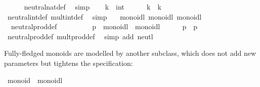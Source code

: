 \begin{isabellebody}
\ \ \ \ \isamarkupfalse%
\ neutral{\isacharunderscore}nat{\isacharunderscore}def\ \isamarkupfalse%
\ simp\isanewline
{}\isamarkupfalse%
\isanewline
\ \ \isamarkupfalse%
\ k\ {\isacharcolon}{\isacharcolon}\ int\isanewline
\ \ \isamarkupfalse%
\ {\isachardoublequoteopen}{\isasymone}\ {\isasymotimes}\ k\ {\isacharequal}\ k{\isachardoublequoteclose}\isanewline
\ \ \ \ \isamarkupfalse%
\ neutral{\isacharunderscore}int{\isacharunderscore}def\ mult{\isacharunderscore}int{\isacharunderscore}def\ \isamarkupfalse%
\ simp\isanewline
{}\isamarkupfalse%
\isanewline
\isanewline
{}\isamarkupfalse%
\isanewline
\isanewline
{}\isamarkupfalse%
\ {\isacharasterisk}\ {\isacharcolon}{\isacharcolon}\ {\isacharparenleft}monoidl{\isacharcomma}\ monoidl{\isacharparenright}\ monoidl\isanewline
{}\isanewline
\isanewline
{}\isamarkupfalse%
\isanewline
\ \ neutral{\isacharunderscore}prod{\isacharunderscore}def{\isacharcolon}\ {\isachardoublequoteopen}{\isasymone}\ {\isacharequal}\ {\isacharparenleft}{\isasymone}{\isacharcomma}\ {\isasymone}{\isacharparenright}{\isachardoublequoteclose}\isanewline
\isanewline
{}\isamarkupfalse%
\ \isamarkupfalse%
\isanewline
\ \ \isamarkupfalse%
\ p\ {\isacharcolon}{\isacharcolon}\ {\isachardoublequoteopen}{\isasymalpha}{\isasymColon}monoidl\ {\isasymtimes}\ {\isasymbeta}{\isasymColon}monoidl{\isachardoublequoteclose}\isanewline
\ \ \isamarkupfalse%
\ {\isachardoublequoteopen}{\isasymone}\ {\isasymotimes}\ p\ {\isacharequal}\ p{\isachardoublequoteclose}\isanewline
\ \ \ \ \isamarkupfalse%
\ neutral{\isacharunderscore}prod{\isacharunderscore}def\ mult{\isacharunderscore}prod{\isacharunderscore}def\ \isamarkupfalse%
\ {\isacharparenleft}simp\ add{\isacharcolon}\ neutl{\isacharparenright}\isanewline
{}\isamarkupfalse%
\isanewline
\isanewline
{}\isamarkupfalse%
%
\endisatagquote
{\isafoldquote}%
%
\isadelimquote
%
\endisadelimquote
%
\begin{isamarkuptext}%
\noindent Fully-fledged monoids are modelled by another subclass,
  which does not add new parameters but tightens the specification:%
\end{isamarkuptext}%
\isamarkuptrue%
%
\isadelimquote
%
\endisadelimquote
%
\isatagquote
{}\isamarkupfalse%
\ monoid\ {\isacharequal}\ monoidl\ {\isacharplus}\isanewline

\end{isabellebody}
